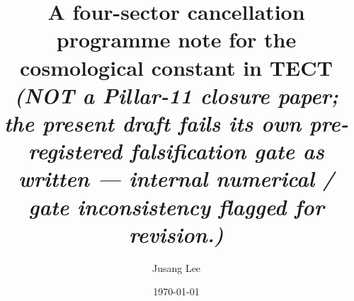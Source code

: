 



\title{A four-sector cancellation programme note for the cosmological
constant in TECT \\
\normalsize{\textit{(NOT a Pillar-11 closure paper; the present
draft fails its own pre-registered falsification gate as written ---
internal numerical / gate inconsistency flagged for revision.)}}}

\author{Jusang Lee}

\date{\today}

